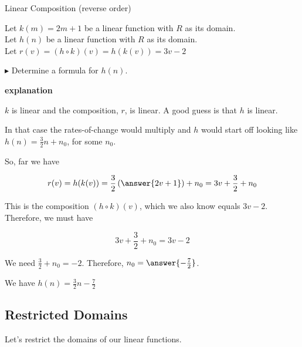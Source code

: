 \documentclass{ximera}
\begin{document}
\begin{example} Linear Composition (reverse order)

Let $k(m) = 2 m + 1$ be a linear function with \textbf{$R$} as its domain. \\
Let $h(n)$ be a linear function with \textbf{$R$} as its domain. \\


Let $r(v) = (h \circ k)(v) = h(k(v)) = 3 v - 2$ 

$\blacktriangleright$  Determine a formula for $h(n)$.




\textbf{\textcolor{red!75!green}{explanation}} 


$k$ is linear and the composition, $r$, is linear. A good guess is that $h$ is linear.  

In that case the rates-of-change would multiply and $h$ would start off looking like $h(n) = \frac{3}{2} n + n_0$, for some $n_0$.


So, far we have 

\[   r(v) = h(k(v)) = \frac{3}{2} \left( \answer{2 v + 1} \right) + n_0 =  3 v + \frac{3}{2} + n_0\]


This is the composition $(h \circ k)(v)$, which we also know equals $3 v - 2$.  Therefore, we must have 

\[
3 v + \frac{3}{2} + n_0  = 3 v - 2
\]


We need $\frac{3}{2} + n_0 = -2$.  Therefore, $n_0 = \answer{-\frac{7}{2}}$.


We have $h(n) = \frac{3}{2} n - \frac{7}{2}$



\end{example}

















\subsection*{Restricted Domains}


Let's restrict the domains of our linear functions.
\end{document}
